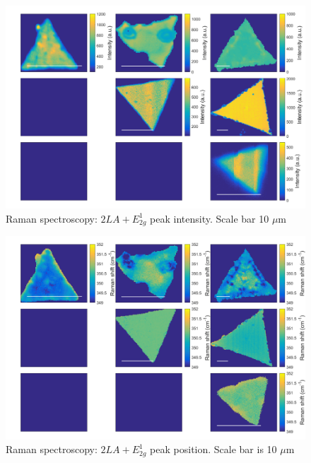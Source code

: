 \documentclass[12pt]{article}
\begin{document}
{\begin{figure}[h]
\begin{center}
\includegraphics[scale=0.3]{PaperSIMapsIntensityE.png}
\caption{Raman spectroscopy: $2LA+E^1_{2g}$ peak intensity. Scale bar 10 $\mu$m}
\label{fig:PaperSIMapsIntensityE}
\end{center}
\end{figure}

\begin{figure}[h]
\begin{center}
\includegraphics[scale=0.3]{PaperSIMapsPositionE.png}
\caption{Raman spectroscopy: $2LA+E^1_{2g}$ peak position. Scale bar is 10 $\mu$m}
\label{fig:PaperSIMapsPositionE}
\end{center}
\end{figure}

}
\end{document}
